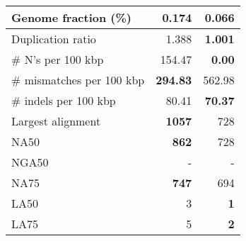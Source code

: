\documentclass[12pt,a4paper]{article}
\begin{document}
\begin{table}[ht]
\begin{center}
\begin{tabular}{|l*{2}{|r}|}
Genome fraction (\%) & {\bf 0.174} & 0.066 \\ \hline
Duplication ratio & 1.388 & {\bf 1.001} \\ \hline
\# N's per 100 kbp & 154.47 & {\bf 0.00} \\ \hline
\# mismatches per 100 kbp & {\bf 294.83} & 562.98 \\ \hline
\# indels per 100 kbp & 80.41 & {\bf 70.37} \\ \hline
Largest alignment & {\bf 1057} & 728 \\ \hline
NA50 & {\bf 862} & 728 \\ \hline
NGA50 & - & - \\ \hline
NA75 & {\bf 747} & 694 \\ \hline
LA50 & 3 & {\bf 1} \\ \hline
LA75 & 5 & {\bf 2} \\ \hline
\end{tabular}
\end{center}
\end{table}
\end{document}
